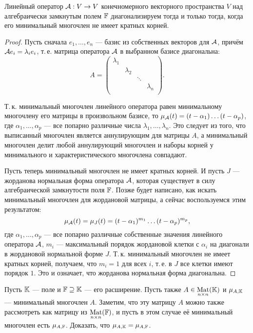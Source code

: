 \begin{theorem}
    Линейный оператор $\mathcal{A}: V \to V$ конечномерного векторного пространства $V$ над алгебраически замкнутым полем $\mathbb{F}$ диагонализируем тогда и только тогда, когда его минимальный многочлен не имеет кратных корней.
\end{theorem}

\begin{proof}
    Пусть сначала $e_1, \ldots, e_n$ --- базис из собственных векторов для $\mathcal{A}$, причём $\mathcal{A} e_i = \lambda_ie_i$, т.\,е. матрица оператора $\mathcal{A}$ в выбранном базисе диагональна:
    \[
        A =
        \begin{pmatrix}
            \lambda_1 &  &  & \\
             & \lambda_2 &  &  \\
             &  & \ddots &  \\
             &  &  & \lambda_n \\
        \end{pmatrix}.
    \]

    Т.\,к. минимальный многочлен линейного оператора равен минимальному многочлену его матрицы в произвольном базисе, то $\mu_{\mathcal{A}}(t) = (t - \alpha_1)\ldots(t - \alpha_p)$, где $\alpha_1, \ldots, \alpha_p$ --- все попарно различные числа $\lambda_1, \ldots, \lambda_n$. Это следует из того, что выписанный многочлен является аннулирующим для матрицы $A$, а минимальный многочлен делит любой аннулирующий многочлен и наборы корней у минимального и характеристического многочлена совпадают.

    Пусть теперь минимальный многочлен не имеет кратных корней. И пусть $J$ --- жорданова нормальная форма оператора $\mathcal{A}$, которая существует в силу алгебраической замкнутости поля $\mathbb{F}$. Позже будет написано, как искать минимальный многочлен для жордановой матрицы, а сейчас воспользуемся этим результатом:
    \[
        \mu_{\mathcal{A}}(t) = \mu_J(t) = (t - \alpha_1)^{m_1}\ldots(t - \alpha_p)^{m_p},
    \]
    где $\alpha_1, \ldots, \alpha_p$ --- все попарно различные собственные значения линейного оператора $\mathcal{A}$, $m_i$ --- максимальный порядок жордановой клетки с $\alpha_i$ на диагонали в жордановой нормальной форме $J$. Т.\,к. минимальный многочлен не имеет кратных корней, получаем, что $m_i = 1$ для всех $i$, т.\,е. в $J$ все клетки имеют порядок $1$. Это и означает, что жорданова нормальная форма диагональна.
\end{proof}

\begin{problem}
    Пусть $\mathbb{K}$ --- поле и $\mathbb{F} \supseteq \mathbb{K}$ --- его расширение. Пусть также $A \in \underset{n \times n}{\operatorname{Mat}}(\mathbb{K})$ и $\mu_{A, \mathbb{K}}$ --- минимальный многочлен $A$. Заметим, что эту матрицу $A$ можно также рассмотреть как матрицу из $\underset{n \times n}{\operatorname{Mat}}(\mathbb{F})$, и пусть в этом случае её минимальный многочлен есть $\mu_{A, \mathbb{F}}$. Доказать, что $\mu_{A, \mathbb{K}} = \mu_{A, \mathbb{F}}$.
\end{problem}

